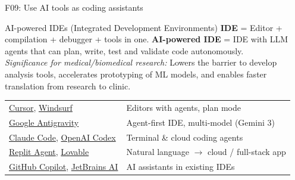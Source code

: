 \documentclass[aspectratio=169, 10pt]{beamer}
\begin{document}
\begin{frame}{F09: Use AI tools as coding assistants}
    \vspace{0.1cm}
    \begin{block}{\footnotesize AI-powered IDEs (Integrated Development Environments)}
        \scriptsize
        \textbf{IDE} = Editor + compilation + debugger + tools in one.
        \textbf{AI-powered IDE} = IDE with LLM agents that can plan, write, test and validate code autonomously.\\
        \textit{Significance for medical/biomedical research:} Lowers the barrier to develop analysis tools, accelerates prototyping of ML models, and enables faster translation from research to clinic.\\[3pt]
        \begin{tabular}{@{}ll@{}}
        \href{https://www.cursor.com/}{Cursor}, \href{https://windsurf.com/}{Windsurf} & Editors with agents, plan mode \\
        \href{https://antigravity.google}{Google Antigravity} & Agent-first IDE, multi-model (Gemini 3) \\
        \href{https://claude.ai/code}{Claude Code}, \href{https://openai.com/codex/}{OpenAI Codex} & Terminal \& cloud coding agents \\
        \href{https://replit.com/}{Replit Agent}, \href{https://lovable.dev/}{Lovable} & Natural language $\rightarrow$ cloud / full-stack app \\
        \href{https://github.com/features/copilot}{GitHub Copilot}, \href{https://www.jetbrains.com/ai/}{JetBrains AI} & AI assistants in existing IDEs
        \end{tabular}
    \end{block}
\end{frame}
\end{document}
